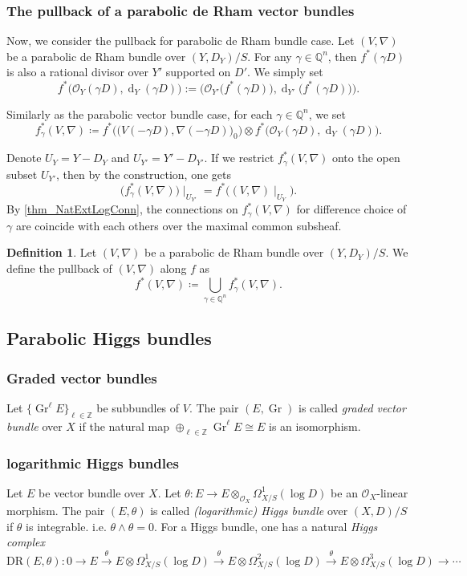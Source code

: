 \documentclass[12pt,twoside]{book}
\theoremstyle{plain}
\theoremstyle{definition}
\newtheorem{definition}[definition]{Definition}
\theoremstyle{remark}
\newcommand{\bQ}{{\mathbb Q}}
\newcommand{\bZ}{{\mathbb Z}}
\newcommand{\mO}{{\mathcal O}}
\DeclareMathOperator\rmd{d}
\DeclareMathOperator\Gr{Gr}
\numberwithin{equation}{section}
\def\DR{{\mathrm{DR}}}
\begin{document}
\subsubsection{The pullback of a parabolic de Rham vector bundles}

Now, we consider the pullback for parabolic de Rham bundle case. Let $(V,\nabla)$ be a parabolic de Rham bundle over $(Y,D_Y)/S$. For any $\gamma \in \bQ^n$, then $f^*(\gamma D)$ is also a rational divisor over $Y'$ supported on $D'$. We simply set
\[f^*\Big(\mO_Y(\gamma D),\rmd_Y(\gamma D)\Big) := \Big(\mO_{Y'}\big(f^*(\gamma D)\big),\rmd_{Y'}\big(f^*(\gamma D)\big)\Big).\]

Similarly as the parabolic vector bundle case, for each $\gamma \in \bQ^n$, we set
\[f^*_{\gamma}(V,\nabla)
\coloneqq f^*\Big(\big(V(-\gamma D),\nabla(-\gamma D)\big)_0\Big) \otimes f^*\Big(\mO_Y(\gamma D),\rmd_Y(\gamma D)\Big).\]

Denote $U_Y=Y-D_Y$ and $U_{Y'}=Y'-D_{Y'}$. If we restrict $f^*_{\gamma}(V,\nabla)$ onto the open subset $U_{Y'}$, then by the construction, one gets
\[\Big(f^*_{\gamma}(V,\nabla)\Big)\mid_{U_{Y'}}=f^*\Big((V,\nabla)\mid_{U_Y}\Big).\]
By \autoref{thm_NatExtLogConn}, the connections on $f^*_{\gamma}(V,\nabla)$ for difference choice of $\gamma$ are coincide with each others over the maximal common subsheaf.
\begin{definition} \label{def:pullbackdR}
Let $(V,\nabla)$ be a parabolic de Rham bundle over $(Y,D_Y)/S$. We define the pullback of $(V,\nabla)$ along $f$ as
\[f^*(V,\nabla)\coloneqq \bigcup_{\gamma\in\bQ^n} f^*_{\gamma}(V,\nabla).\]
\end{definition}

\subsection{Parabolic Higgs bundles}

\subsubsection{Graded vector bundles}
Let $\{\Gr^\ell E\}_{\ell\in \bZ}$ be subbundles of $V$. The pair $(E,\Gr)$ is called \emph{graded vector bundle} over $X$ if the natural map $ \oplus_{\ell\in \bZ} \Gr^\ell E\cong E$ is an isomorphism.

\subsubsection{logarithmic Higgs bundles}
Let $E$ be vector bundle over $X$. Let $\theta\colon E\rightarrow E\otimes_{\mO_X} \Omega^1_{X/S}(\log D)$ be an $\mO_X$-linear morphism. The pair $(E,\theta)$ is called \emph{(logarithmic) Higgs bundle} over $(X,D)/S$ if $\theta$ is integrable. i.e. $\theta\wedge\theta = 0$. For a Higgs bundle, one has a natural \emph{Higgs complex}
\[\DR(E,\theta): 0\rightarrow E
\xrightarrow{\theta} E\otimes\Omega^1_{X/S}(\log D)
\xrightarrow{\theta} E\otimes\Omega^2_{X/S}(\log D)
\xrightarrow{\theta} E\otimes\Omega^3_{X/S}(\log D) \rightarrow \cdots \]
\end{document}
